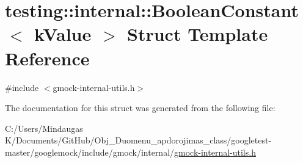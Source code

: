 \hypertarget{structtesting_1_1internal_1_1_boolean_constant}{}\section{testing\+::internal\+::Boolean\+Constant$<$ k\+Value $>$ Struct Template Reference}
\label{structtesting_1_1internal_1_1_boolean_constant}


{\ttfamily \#include $<$gmock-\/internal-\/utils.\+h$>$}



The documentation for this struct was generated from the following file\+:\begin{DoxyCompactItemize}
\item 
C\+:/\+Users/\+Mindaugas K/\+Documents/\+Git\+Hub/\+Obj\+\_\+\+Duomenu\+\_\+apdorojimas\+\_\+class/googletest-\/master/googlemock/include/gmock/internal/\mbox{\hyperlink{googletest-master_2googlemock_2include_2gmock_2internal_2gmock-internal-utils_8h}{gmock-\/internal-\/utils.\+h}}\end{DoxyCompactItemize}

